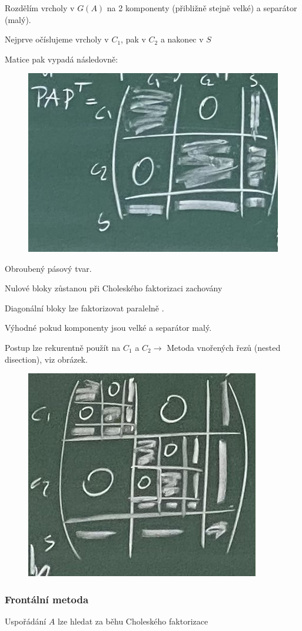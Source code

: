 \documentclass[../main.tex]{subfiles}
\begin{document}
Rozdělím vrcholy v $G(A)$ na 2 komponenty (přibližně stejně velké) a separátor (malý).

Nejprve očíslujeme vrcholy  v $C_1$, pak v $C_2$ a nakonec v $S$

Matice pak vypadá následovně:

\begin{figure}[H]
    \centering
    \includegraphics[width=0.5\linewidth]{images/2-11architekt.jpg}
\end{figure}

Obroubený pásový tvar. 

Nulové bloky zůstanou při Choleského faktorizaci zachovány 


Diagonální bloky lze faktorizovat paralelně .

Výhodné pokud komponenty jsou velké a separátor malý.

Postup lze  rekurentně použít na $C_1$ a $C_2\rightarrow$ Metoda vnořených řezů (nested disection), viz obrázek.
\begin{figure}[H]
    \centering
    \includegraphics[width=0.5\linewidth]{images/2-11-nesteddissection.jpg}
\end{figure}

\subsubsection{Frontální metoda}

Uspořádání $A$ lze hledat za běhu Choleského faktorizace 
\end{document}
